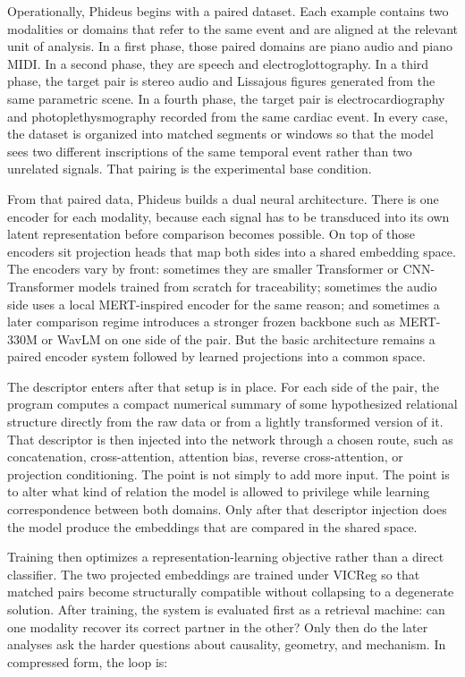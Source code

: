 Operationally, Phideus begins with a paired dataset. Each example contains two modalities or domains that refer to the same event and are aligned at the relevant unit of analysis. In a first phase, those paired domains are piano audio and piano MIDI. In a second phase, they are speech and electroglottography. In a third phase, the target pair is stereo audio and Lissajous figures generated from the same parametric scene. In a fourth phase, the target pair is electrocardiography and photoplethysmography recorded from the same cardiac event. In every case, the dataset is organized into matched segments or windows so that the model sees two different inscriptions of the same temporal event rather than two unrelated signals. That pairing is the experimental base condition. 

From that paired data, Phideus builds a dual neural architecture. There is one encoder for each modality, because each signal has to be transduced into its own latent representation before comparison becomes possible. On top of those encoders sit projection heads that map both sides into a shared embedding space. The encoders vary by front: sometimes they are smaller Transformer or CNN-Transformer models trained from scratch for traceability; sometimes the audio side uses a local MERT-inspired encoder for the same reason; and sometimes a later comparison regime introduces a stronger frozen backbone such as MERT-330M or WavLM on one side of the pair. But the basic architecture remains a paired encoder system followed by learned projections into a common space.

The descriptor enters after that setup is in place. For each side of the pair, the program computes a compact numerical summary of some hypothesized relational structure directly from the raw data or from a lightly transformed version of it. That descriptor is then injected into the network through a chosen route, such as concatenation, cross-attention, attention bias, reverse cross-attention, or projection conditioning. The point is not simply to add more input. The point is to alter what kind of relation the model is allowed to privilege while learning correspondence between both domains. Only after that descriptor injection does the model produce the embeddings that are compared in the shared space.

Training then optimizes a representation-learning objective rather than a direct classifier. The two projected embeddings are trained under VICReg so that matched pairs become structurally compatible without collapsing to a degenerate solution. After training, the system is evaluated first as a retrieval machine: can one modality recover its correct partner in the other? Only then do the later analyses ask the harder questions about causality, geometry, and mechanism. In compressed form, the loop is:


